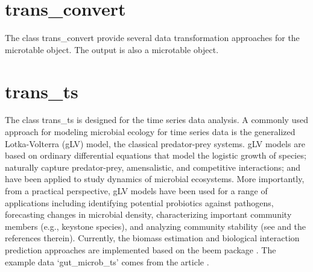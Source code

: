 \documentclass[
]{book}
\newenvironment{Shaded}{\begin{snugshade}}{\end{snugshade}}
\newcommand{\AttributeTok}[1]{\textcolor[rgb]{0.77,0.63,0.00}{#1}}
\newcommand{\CommentTok}[1]{\textcolor[rgb]{0.56,0.35,0.01}{\textit{#1}}}
\newcommand{\FunctionTok}[1]{\textcolor[rgb]{0.00,0.00,0.00}{#1}}
\newcommand{\NormalTok}[1]{#1}
\newcommand{\OtherTok}[1]{\textcolor[rgb]{0.56,0.35,0.01}{#1}}
\newcommand{\SpecialCharTok}[1]{\textcolor[rgb]{0.00,0.00,0.00}{#1}}
\newcommand{\StringTok}[1]{\textcolor[rgb]{0.31,0.60,0.02}{#1}}
\begin{document}
\hypertarget{trans_convert}{%
\section{trans\_convert}\label{trans_convert}}

The class trans\_convert provide several data transformation approaches for the microtable object.
The output is also a microtable object.

\begin{Shaded}
\end{Shaded}

\hypertarget{trans_ts}{%
\section{trans\_ts}\label{trans_ts}}

The class trans\_ts is designed for the time series data analysis.
A commonly used approach for modeling microbial ecology for time series data is the generalized Lotka-Volterra (gLV) model, the classical predator-prey systems.
gLV models are based on ordinary differential equations that model the logistic growth of species;
naturally capture predator-prey, amensalistic, and competitive interactions; and have been applied to study dynamics of microbial ecosystems.
More importantly, from a practical perspective, gLV models have been used for a range of applications including identifying potential probiotics
against pathogens, forecasting changes in microbial density, characterizing important community members (e.g., keystone species),
and analyzing community stability (see \citep{Li_expectation_2019} and the references therein).
Currently, the biomass estimation and biological interaction prediction approaches are implemented based on the beem package \citep{Li_expectation_2019}.
The example data `gut\_microb\_ts' comes from the article \citep{Gibbons_twodynamic_2017}.
\end{document}

